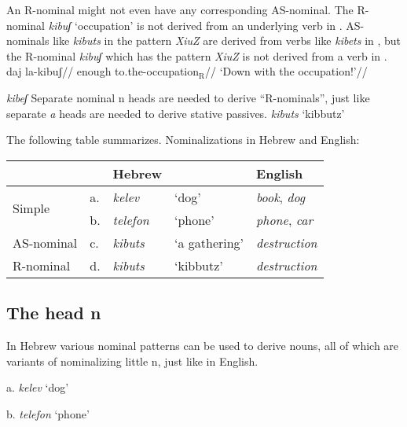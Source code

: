 An R-nominal might not even have any corresponding AS-nominal. The R-nominal \emph{kibuʃ} `occupation' is not derived from an underlying verb in \tpie. AS-nominals like \emph{kibuts} in the pattern \emph{XiuZ} are derived from verbs like \emph{kibets} in \tpie, but the R-nominal \emph{kibuʃ} which has the pattern \emph{XiuZ} is not derived from a verb in \tpie.
\pex
	\a \begingl
		\gla daj la-kibuʃ//
		\glb enough to.the-occupation$_{\text{R}}$//
		\glft `Down with the occupation!'//
	\endgl
	
	\a \ljudge{*} \emph{kibeʃ}
\xe
Separate nominal n heads are needed to derive ``R-nominals'', just like separate \emph{a} heads are needed to derive stative passives.
\ex
	\emph{kibuts} `kibbutz'\\
\xe

The following table summarizes.
\ex Nominalizations in Hebrew and English:\\
	\begin{tabular}{l|lll|l}
	 & & Hebrew & & English\\\hline
	\multirow{2}{*}{Simple}     & a. & \emph{kelev} & `dog' & \emph{book}, \emph{dog}\\
			&    b. & \emph{telefon} & `phone' & \emph{phone}, \emph{car}\\\hline
	AS-nominal & c. & \emph{kibuts} & `a gathering' & \emph{destruction}\\\hline
	R-nominal  & d. & \emph{kibuts} & `kibbutz'     & \emph{destruction}\\
	\end{tabular}
\xe


	\subsection{The head n} \label{passn:n:n}


In Hebrew various nominal patterns can be used to derive nouns, all of which are variants of nominalizing little n, just like in English.
\ex
	\begin{minipage}[t]{0.3\textwidth}
		a. \emph{kelev} `dog'\\
	\end{minipage}
	\begin{minipage}[t]{0.3\textwidth}
		b. \emph{telefon} `phone'\\
	\end{minipage}
\xe	


